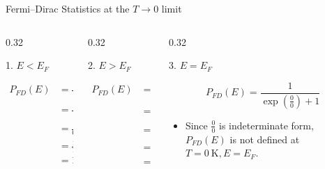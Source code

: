 \begin{frame}[label=pre-M2T1-slot1]{Fermi--Dirac Statistics at the $T \to 0$ limit}
	\begin{columns}
		\begin{column}[t]{0.32\textwidth}
			\begin{center}
				1. \(E < E_F\)
			\end{center}
			\begin{align*}
				P_{FD}(E) &= \frac{1}{\exp\left(\frac{\text{-ve}}{0}\right) + 1}\\
				&= \frac{1}{\exp\left(-\infty\right) + 1}\\
				&= \frac{1}{0 + 1}\\
				&= \frac{1}{1}\\
				&= 1
			\end{align*}
		\end{column}
		\begin{column}[t]{0.32\textwidth}
			\begin{center}
				2. \(E > E_F\)
			\end{center}
			\begin{align*}
				P_{FD}(E) &= \frac{1}{\exp\left(\frac{\text{+ve}}{0}\right) + 1}\\
				&= \frac{1}{\exp\left(\infty\right) + 1}\\
				&= \frac{1}{\infty + 1}\\
				&= \frac{1}{\infty}\\
				&= 0
			\end{align*}
		\end{column}
		\begin{column}[t]{0.32\textwidth}
			\begin{center}
				3. \(E = E_F\)
			\end{center}
			\[
				P_{FD}(E) = \frac{1}{\exp\left(\frac{0}{0}\right) + 1}
			\]
			\begin{itemize}
				\item Since \(\tfrac{0}{0}\) is indeterminate form, \(P_{FD}(E)\) is not defined at \(T= \SI{0}{\kelvin}, E=E_F\).
			\end{itemize}
		\end{column}
	\end{columns}
\end{frame}

